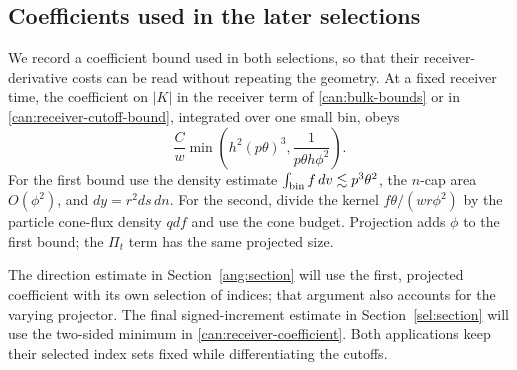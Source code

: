\subsection{Coefficients used in the later selections}

We record a coefficient bound used in both selections, so that their
receiver-derivative costs can be read without repeating the geometry.
At a fixed receiver time, the coefficient on $|K|$ in the receiver term of
\eqref{can:bulk-bounds} or in \eqref{can:receiver-cutoff-bound}, integrated
over one small bin, obeys
\begin{equation}\label{can:receiver-coefficient}
 \frac Cw\min\left(h^2(p\theta)^3,
                       \frac1{p\theta h\phi^2}\right).
\end{equation}
For the first bound use the density estimate
$\int_{\rm bin}f\,dv\lesssim p^3\theta^2$, the $n$-cap area
$O(\phi^2)$, and $dy=r^2ds\,dn$. For the second, divide the kernel
$f\theta/(wr\phi^2)$ by the particle cone-flux density $qdf$ and use
the cone budget. Projection adds $\phi$ to the first bound; the
$\Pi_t$ term has the same projected size.

The direction estimate in Section~\ref{ang:section} will use the first,
projected coefficient with its own selection of indices; that argument
also accounts for the varying projector. The final signed-increment
estimate in Section~\ref{sel:section} will use the two-sided minimum
in \eqref{can:receiver-coefficient}. Both applications keep their
selected index sets fixed while differentiating the cutoffs.
